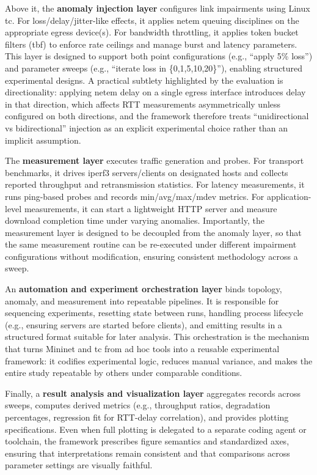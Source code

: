 \documentclass[11pt,a4paper]{article}
\begin{document}
Above it, the \textbf{anomaly injection layer} configures link impairments using Linux tc. For loss/delay/jitter-like effects, it applies netem queuing disciplines on the appropriate egress device(s). For bandwidth throttling, it applies token bucket filters (tbf) to enforce rate ceilings and manage burst and latency parameters. This layer is designed to support both point configurations (e.g., ``apply 5\% loss'') and parameter sweeps (e.g., ``iterate loss in \{0,1,5,10,20\}''), enabling structured experimental designs. A practical subtlety highlighted by the evaluation is directionality: applying netem delay on a single egress interface introduces delay in that direction, which affects RTT measurements asymmetrically unless configured on both directions, and the framework therefore treats ``unidirectional vs bidirectional'' injection as an explicit experimental choice rather than an implicit assumption.

The \textbf{measurement layer} executes traffic generation and probes. For transport benchmarks, it drives iperf3 servers/clients on designated hosts and collects reported throughput and retransmission statistics. For latency measurements, it runs ping-based probes and records min/avg/max/mdev metrics. For application-level measurements, it can start a lightweight HTTP server and measure download completion time under varying anomalies. Importantly, the measurement layer is designed to be decoupled from the anomaly layer, so that the same measurement routine can be re-executed under different impairment configurations without modification, ensuring consistent methodology across a sweep.

An \textbf{automation and experiment orchestration layer} binds topology, anomaly, and measurement into repeatable pipelines. It is responsible for sequencing experiments, resetting state between runs, handling process lifecycle (e.g., ensuring servers are started before clients), and emitting results in a structured format suitable for later analysis. This orchestration is the mechanism that turns Mininet and tc from ad hoc tools into a reusable experimental framework: it codifies experimental logic, reduces manual variance, and makes the entire study repeatable by others under comparable conditions.

Finally, a \textbf{result analysis and visualization layer} aggregates records across sweeps, computes derived metrics (e.g., throughput ratios, degradation percentages, regression fit for RTT-delay correlation), and provides plotting specifications. Even when full plotting is delegated to a separate coding agent or toolchain, the framework prescribes figure semantics and standardized axes, ensuring that interpretations remain consistent and that comparisons across parameter settings are visually faithful.
\end{document}
